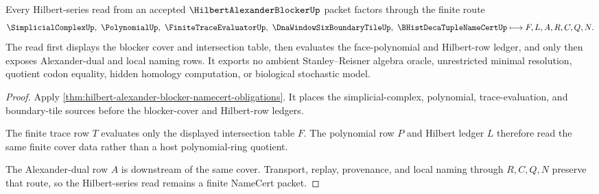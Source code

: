 \begin{theorem}
\label{thm:hilbert-alexander-blocker-finite-hilbert-row}
Every Hilbert-series read from an accepted $\HilbertAlexanderBlockerUp$ packet factors through the finite route
$$
\SimplicialComplexUp,\ \PolynomialUp,\ \FiniteTraceEvaluatorUp,\ \DnaWindowSixBoundaryTileUp,\ \BHistDecaTupleNameCertUp
\longmapsto
F,L,A,R,C,Q,N .
$$
The read first displays the blocker cover and intersection table, then evaluates the face-polynomial and Hilbert-row ledger, and only then exposes Alexander-dual and local naming rows. It exports no ambient Stanley--Reisner algebra oracle, unrestricted minimal resolution, quotient codon equality, hidden homology computation, or biological stochastic model.
\end{theorem}
\begin{proof}
Apply \autoref{thm:hilbert-alexander-blocker-namecert-obligations}. It places the simplicial-complex, polynomial, trace-evaluation, and boundary-tile sources before the blocker-cover and Hilbert-row ledgers.

The finite trace row $T$ evaluates only the displayed intersection table $F$. The polynomial row $P$ and Hilbert ledger $L$ therefore read the same finite cover data rather than a host polynomial-ring quotient.

The Alexander-dual row $A$ is downstream of the same cover. Transport, replay, provenance, and local naming through $R,C,Q,N$ preserve that route, so the Hilbert-series read remains a finite NameCert packet.
\end{proof}




